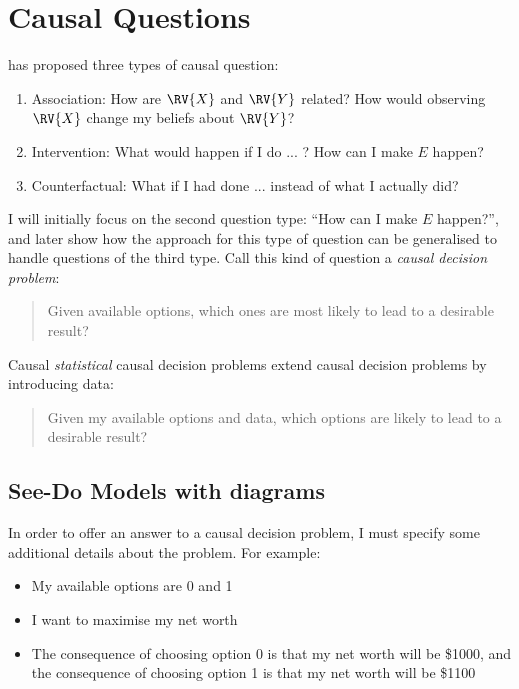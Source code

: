 



\section{Causal Questions}

\citet{pearl_book_2018} has proposed three types of causal question:
\begin{enumerate}
    \item Association: How are $\RV{X}$ and $\RV{Y}$ related? How would observing $\RV{X}$ change my beliefs about $\RV{Y}$?
    \item Intervention: What would happen if I do ... ? How can I make $E$ happen?
    \item Counterfactual: What if I had done ... instead of what I actually did?
\end{enumerate}

I will initially focus on the second question type: ``How can I make $E$ happen?'', and later show how the approach for this type of question can be generalised to handle questions of the third type. Call this kind of question a \emph{causal decision problem}:

\begin{quote}\label{def:causal_decision_problem}
    Given available options, which ones are most likely to lead to a desirable result?
\end{quote}

Causal \emph{statistical} causal decision problems extend causal decision problems by introducing data:

\begin{quote}\label{def:causal_statistical_decision_problem}
    Given my available options and data, which options are likely to lead to a desirable result?
\end{quote}

\subsection{See-Do Models with diagrams}

In order to offer an answer to a causal decision problem, I must specify some additional details about the problem. For example:

\begin{itemize}
    \item My available options are 0 and 1
    \item I want to maximise my net worth
    \item The consequence of choosing option 0 is that my net worth will be \$1000, and the consequence of choosing option 1 is that my net worth will be \$1100
\end{itemize}

